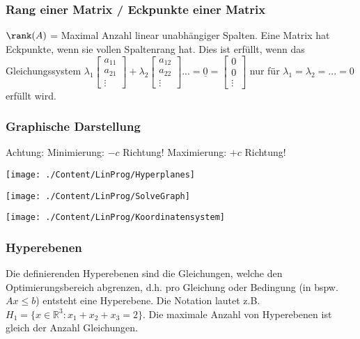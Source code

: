 	\subsubsection{Rang einer Matrix / Eckpunkte einer Matrix}
	  $\rank(A)$ = Maximal Anzahl linear unabhängiger Spalten. Eine Matrix hat Eckpunkte, wenn sie vollen Spaltenrang hat. Dies ist erfüllt, wenn das Gleichungssystem $\lambda_1 \begin{bmatrix}
   	  a_{11}\\a_{21}\\ \vdots
 	  \end{bmatrix} + 
 	  \lambda_2\begin{bmatrix}
   	  a_{12}\\a_{22}\\ \vdots
 	  \end{bmatrix} ...
 	  = \underline{0} = \begin{bmatrix}
 	     	  0\\0\\ \vdots
 	  \end{bmatrix}$ nur für $\lambda_1 = \lambda_2 = ... = 0$ erfüllt wird.
 	  
 	\subsubsection{Graphische Darstellung}
 	  Achtung: Minimierung: $-c$ Richtung! Maximierung: $+c$ Richtung!\\
 	  
 	\begin{minipage}{6.2cm}
 		\texttt{[image: ./Content/LinProg/Hyperplanes]}
 	\end{minipage}
 	\begin{minipage}{6.8cm}
 	 	\texttt{[image: ./Content/LinProg/SolveGraph]}
 	\end{minipage}
 	\begin{minipage}{5.9cm}
 	 	 \texttt{[image: ./Content/LinProg/Koordinatensystem]}
 	\end{minipage}
 	
 	  
  \subsubsection{Hyperebenen}
    Die definierenden Hyperebenen sind die Gleichungen, welche den Optimierungsbereich abgrenzen, d.h. pro Gleichung oder Bedingung (in bspw. $Ax \leq b$) entsteht eine Hyperebene. Die Notation lautet z.B. $H_1 = \{x \in \mathbb{R}^3: x_1 + x_2 + x_3 = 2\}$. Die maximale Anzahl von Hyperebenen ist gleich der Anzahl Gleichungen.
    

